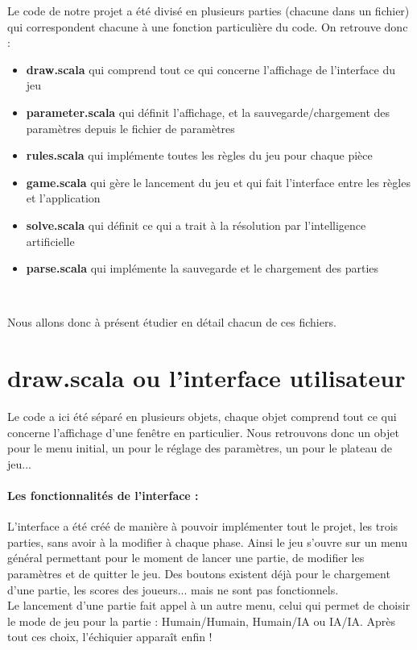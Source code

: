 \documentclass[a4paper]{article}
\begin{document}
Le code de notre projet a été divisé en plusieurs parties (chacune dans un fichier) qui correspondent chacune à une fonction particulière du code. On retrouve donc :
\begin{itemize}
\item \textbf{draw.scala} qui comprend tout ce qui concerne l'affichage de l'interface du jeu
\item \textbf{parameter.scala} qui définit l'affichage, et la sauvegarde/chargement des paramètres depuis le fichier de paramètres
\item \textbf{rules.scala} qui implémente toutes les règles du jeu pour chaque pièce
\item \textbf{game.scala} qui gère le lancement du jeu et qui fait l'interface entre les règles et l'application
\item \textbf{solve.scala} qui définit ce qui a trait à la résolution par l'intelligence artificielle
\item \textbf{parse.scala} qui implémente la sauvegarde et le chargement des parties
\end{itemize}~

Nous allons donc à présent étudier en détail chacun de ces fichiers.

\section{draw.scala ou l'interface utilisateur}

Le code a ici été séparé en plusieurs objets, chaque objet comprend tout ce qui concerne l'affichage d'une fenêtre en particulier. Nous retrouvons donc un objet pour le menu initial, un pour le réglage des paramètres, un pour le plateau de jeu...

\paragraph{Les fonctionnalités de l'interface :}L'interface a été créé de manière à pouvoir implémenter tout le projet, les trois parties, sans avoir à la modifier à chaque phase. Ainsi le jeu s'ouvre sur un menu général permettant pour le moment de lancer une partie, de modifier les paramètres et de quitter le jeu. Des boutons existent déjà pour le chargement d'une partie, les scores des joueurs... mais ne sont pas fonctionnels. \\

Le lancement d'une partie fait appel à un autre menu, celui qui permet de choisir le mode de jeu pour la partie : Humain/Humain, Humain/IA ou IA/IA. Après tout ces choix, l'échiquier apparaît enfin !
\end{document}
